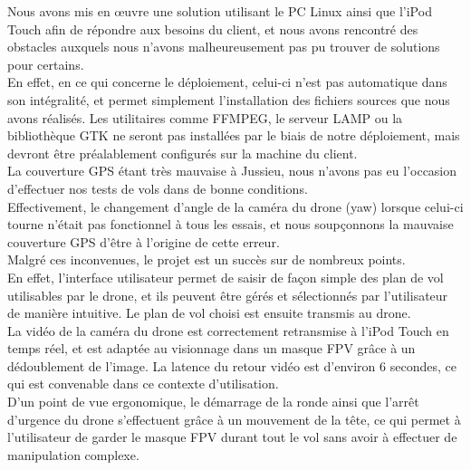 \documentclass{article}
\begin{document}
Nous avons mis en œuvre une solution utilisant le PC Linux ainsi que l'iPod Touch afin de répondre aux besoins du client, et nous avons rencontré des obstacles auxquels nous n'avons malheureusement pas pu trouver de solutions pour certains.\\
En effet, en ce qui concerne le déploiement, celui-ci n'est pas automatique dans son intégralité, et permet simplement l'installation des fichiers sources que nous avons réalisés. Les utilitaires comme FFMPEG, le serveur LAMP ou la bibliothèque GTK ne seront pas installées par le biais de notre déploiement, mais devront être préalablement configurés sur la machine du client.\\
La couverture GPS étant très mauvaise à Jussieu, nous n'avons pas eu l'occasion d'effectuer nos tests de vols dans de bonne conditions.\\
Effectivement, le changement d'angle de la caméra du drone (yaw) lorsque celui-ci tourne n'était pas fonctionnel à tous les essais, et nous soupçonnons la mauvaise couverture GPS d'être à l'origine de cette erreur.\\
Malgré ces inconvenues, le projet est un succès sur de nombreux points.\\
En effet, l'interface utilisateur permet de saisir de façon simple des plan de vol utilisables par le drone, et ils peuvent être gérés et sélectionnés par l'utilisateur de manière intuitive. Le plan de vol choisi est ensuite transmis au drone.\\
La vidéo de la caméra du drone est correctement retransmise à l'iPod Touch en temps réel, et est adaptée au visionnage dans un masque FPV grâce à un dédoublement de l'image. La latence du retour vidéo est d'environ 6 secondes, ce qui est convenable dans ce contexte d'utilisation.\\
D'un point de vue ergonomique, le démarrage de la ronde ainsi que l'arrêt d'urgence du drone s'effectuent grâce à un mouvement de la tête, ce qui permet à l'utilisateur de garder le masque FPV durant tout le vol sans avoir à effectuer de manipulation complexe.

	
 
\end{document}
